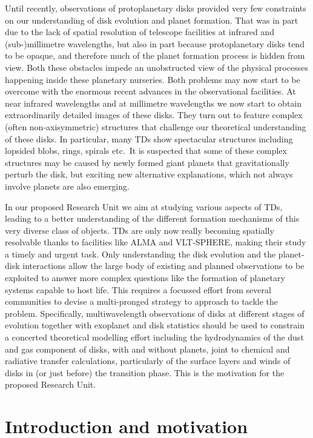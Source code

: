 \documentclass[10pt,fleqn,twoside]{article}
\begin{document}
Until recently, observations of protoplanetary disks provided very few
constraints on our understanding of disk evolution and planet formation. That was in part due
to the lack of spatial resolution of telescope facilities at infrared and
(sub-)millimetre wavelengths, but also in part because protoplanetary disks
tend to be opaque, and therefore much of the planet formation process is
hidden from view. Both these obstacles impede an unobstructed view of the
physical processes happening inside these planetary nurseries. Both problems may now start to
be overcome with the enormous recent advances in the observational
facilities. At near infrared wavelengths and at millimetre wavelengths we
now start to obtain extraordinarily detailed images of these disks. They
turn out to feature complex (often non-axisymmetric) structures that
challenge our theoretical understanding of these disks. In particular,
many TDs show spectacular structures including lopsided blobs, rings,
spirals etc.\ It is suspected 
that some of these complex structures may be caused by newly formed giant
planets that gravitationally perturb the disk, but exciting new
alternative explanations, which not always involve planets are also emerging. 

In our proposed Research Unit we aim at studying various aspects of
TDs, leading to a better understanding of the different formation
mechanisms of this very diverse class of objects. TDs are
only now really becoming spatially resolvable thanks
to facilities like ALMA and VLT-SPHERE, making their study a timely and
urgent task. Only understanding the disk evolution and the planet-disk
interactions allow the large body of existing and planned observations to be
exploited to answer more complex questions like the formation of planetary
systems capable to host life. This requires a focussed effort from
several communities to devise a multi-pronged strategy to approach to
tackle the problem. Specifically, multiwavelength observations of disks at
different stages of evolution together with exoplanet and disk statistics
should be used to constrain a concerted theoretical modelling effort
including the hydrodynamics of the dust and gas component of disks, with and
without planets, joint to chemical and radiative transfer calculations,
particularly of the surface layers and winds of disks in (or just
before) the transition phase. This is the motivation for the proposed Research Unit.


\section{Introduction and motivation}
\end{document}
